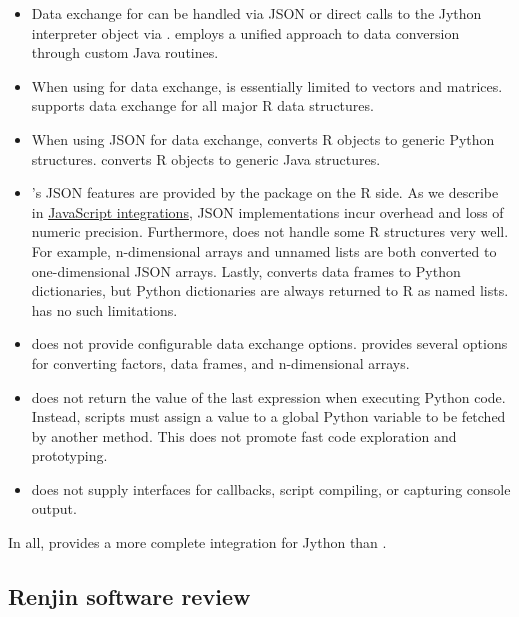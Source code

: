 \begin{itemize}
\item Data exchange for  can be handled via JSON or direct calls to the Jython interpreter object via .  employs a unified approach to data conversion through custom Java routines.

\item When using  for data exchange,  is essentially limited to vectors and matrices.  supports data exchange for all major R data structures.

\item When using JSON for data exchange,  converts R objects to generic Python structures.  converts R objects to generic Java structures.

\item {}'s JSON features are provided by the  package on the R side. As we describe in \hyperlink{javascript-integrations}{JavaScript integrations}, JSON implementations incur overhead and loss of numeric precision. Furthermore,  does not handle some R structures very well. For example, n-dimensional arrays and unnamed lists are both converted to one-dimensional JSON arrays. Lastly,  converts data frames to Python dictionaries, but Python dictionaries are always returned to R as named lists.  has no such limitations.

\item {} does not provide configurable data exchange options.  provides several options for converting factors, data frames, and n-dimensional arrays.

\item {} does not return the value of the last expression when executing Python code. Instead, scripts must assign a value to a global Python variable to be fetched by another  method. This does not promote fast code exploration and prototyping.

\item {} does not supply interfaces for callbacks, script compiling, or capturing console output.
\end{itemize}
In all,  provides a more complete integration for Jython than .

\subsection{Renjin software review}

